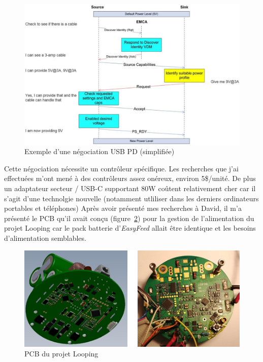\documentclass[a4paper, 11pt]{report}
\begin{document}
\begin{figure}[!h]
\begin{center}
\includegraphics[scale=0.35]{figures/screenshots/usb_pd_nego.png}
\end{center}
\caption{Exemple d’une négociation USB PD (simplifiée) \cite{usb_pd_nego}}
\label{fig:usb_pd_negociation}
\end{figure}
Cette négociation nécessite un contrôleur spécifique. Les recherches que j’ai effectuées m’ont mené à des contrôleurs assez onéreux, environ 5\$/unité. De plus un adaptateur secteur / USB-C supportant 80W coûtent relativement cher car il s'agit d'une technolgie nouvelle (notamment utliliser dans les derniers ordinateurs portables et téléphones)
Après avoir présenté mes recherches à David, il m'a présenté le PCB qu’il avait conçu (figure~\ref{fig:looping_pcb}) pour la gestion de l’alimentation du projet Looping car le pack batterie d'\emph{EasyFeed} allait être identique et les besoins d'alimentation semblables.

\begin{figure}[!h]
\begin{center}
\includegraphics[scale=1]{figures/photos/looping_pcb.jpg}
\end{center}
\caption{PCB du projet Looping}
\label{fig:looping_pcb}
\end{figure}
\end{document}
